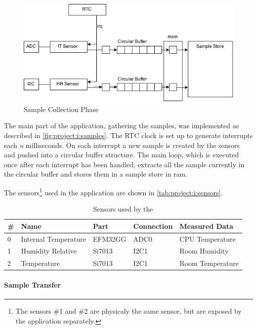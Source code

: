 \begin{figure}[H]
  \begin{center}
    \includegraphics[scale=0.5]{figures/project-i.png}
  \end{center}
  \caption{Sample Collection Phase}
  \label{fig:project:i:samples}
\end{figure}
The main part of the application, gathering the samples, was implemented as described in \autoref{fig:project:i:samples}.
The RTC clock is set up to generate interrupts each \emph{n} milliseconds.
On each interrupt a new sample is created by the sensors and pushed into a circular buffer structure.
The main loop, which is executed once after each interrupt has been handled, extracts all the sample currently in the circular buffer and stores them in a sample store in \gls{ram}.

The sensors\footnote{The sensors \#1 and \#2 are physicaly the same sensor, but are exposed by the application separately.} used in the application are shown in \autoref{tab:project:i:sensors}.

\begin{table}[H]
  \centering
  \begin{tabular}{ l | l | l | l | l }
    \textbf{\#} & \textbf{Name} & \textbf{Part} & \textbf{Connection} & \textbf{Measured Data} \\
    \hline
    0 & Internal Temperature & EFM32GG & ADC0 & CPU Temperature \\
    1 & Humidity Relative & Si7013 & I2C1 & Room Humidity \\
    2 & Temperature & Si7013 & I2C1 & Room Temperature \\
    \hline
  \end{tabular}
  \caption{Sensors used by the {\tracker}}
  \label{tab:project:i:sensors}
\end{table}

\paragraph{Sample Transfer}

